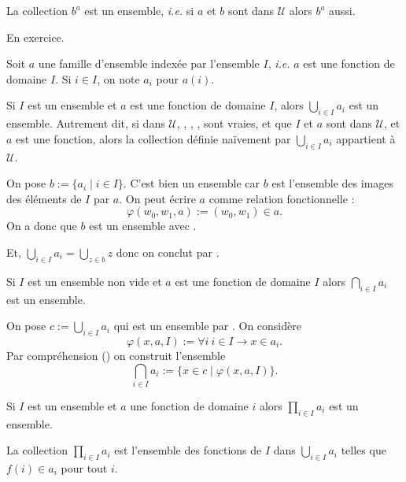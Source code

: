 \documentclass[./main]{subfiles}
\begin{document}
  \begin{prop}
    La collection $b^a$ est un ensemble, \textit{i.e.} si $a$ et $b$ sont dans $\mathcal{U}$ alors $b^a$ aussi.
  \end{prop}
  \begin{prv}
    En exercice.
  \end{prv}

  \begin{rmk}
    Soit $a$ une famille d'ensemble indexée par l'ensemble $I$, \textit{i.e.} $a$ est une fonction de domaine $I$.
    Si $i \in I$, on note $a_i$ pour $a(i)$.
  \end{rmk}
  \begin{prop}
    Si $I$ est un ensemble et $a$ est une fonction de domaine $I$, alors $\bigcup_{i \in  I} a_i$ est un ensemble.
    Autrement dit, si dans $\mathcal{U}$, , , ,  sont vraies, et que $I$ et $a$ sont dans $\mathcal{U}$, et $a$ est une fonction, alors la collection définie naïvement par $\bigcup_{i \in  I} a_i$ appartient à $\mathcal{U}$.
  \end{prop}
  \begin{prv}
    On pose $b := \{a_i  \mid i \in I\}$. C'est bien un ensemble car $b$ est l'ensemble des images des éléments de $I$ par $a$. On peut écrire $a$ comme relation fonctionnelle :
    \[
    \varphi(w_0, w_1, a) := (w_0, w_1) \in a
    .\]
    On a donc que $b$ est un ensemble avec .

    Et, $\bigcup_{i \in  I} a_i = \bigcup_{z \in b} z$ donc on conclut par .
  \end{prv}

  \begin{prop}
    Si $I$ est un ensemble non vide et $a$ est une fonction de domaine $I$ alors $\bigcap_{i \in  I} a_i$ est un ensemble.
  \end{prop}
  \begin{prv}
    On pose $c := \bigcup_{i \in  I} a_i$ qui est un ensemble par .
    On considère \[
    \varphi(x, a, I) := \forall i \: i \in I \to x \in a_i
    .\]
    Par compréhension () on construit l'ensemble \[
    \bigcap_{i \in  I} a_i := \{x \in c  \mid \varphi(x, a, I)\} 
    .\]
  \end{prv}

  \begin{prop}
    Si $I$ est un ensemble et $a$ une fonction de domaine $i$ alors $\prod_{i \in I} a_i $ est un ensemble.
  \end{prop}
  \begin{prv}
    La collection $\prod_{i \in I} a_i$ est l'ensemble des fonctions de $I$ dans $\bigcup_{i \in  I} a_i$ telles que $f(i) \in a_i$ pour tout $i$.
  \end{prv}
\end{document}
